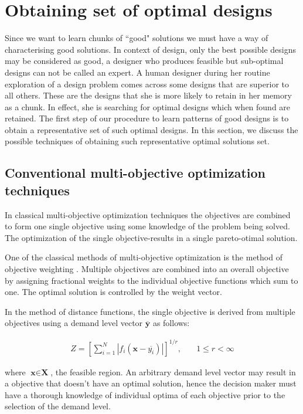 \section{Obtaining set of optimal designs}
Since we want to learn chunks of ``good" solutions we must have a way 
of characterising good solutions. In context of design, only the best
possible designs may be considered as good, a designer who produces 
feasible but sub-optimal designs can not be called an expert. A human 
designer during her routine exploration of a design problem comes 
across some designs that are superior to all others. These are the 
designs that she is more likely to retain in her memory as a chunk. In
effect, she is searching for optimal designs which when found are 
retained. The first step of our procedure to learn patterns of good 
designs is to obtain a representative set of such optimal designs.  
In this section, we discuss the possible techniques of obtaining such 
representative optimal solutions set.

\subsection{Conventional multi-objective optimization techniques}
In classical multi-objective optimization techniques the objectives 
are combined to form one single objective using some knowledge of the 
problem being solved. The optimization of the single objective-results
in a single pareto-otimal solution.

One of the classical methods of multi-objective optimization is the 
method of objective weighting \cite{deb2001,deb1994}. 
Multiple objectives are combined into an overall objective by 
assigning fractional weights to the individual objective functions 
which sum to one. The optimal solution is controlled by the weight 
vector. 

In the method of distance functions, the single objective is derived
from multiple objectives using a demand level vector 
$\overline{\textbf{y}}$ as follows:

\begin{align}
Z = \left[ \displaystyle\sum\limits_{i=1}^N {|f_i(\textbf{x} - \overline{y_i})|}\right] ^{1/r}, \quad &1 \leqslant r < \infty 
\end{align}

where $\textbf{x} \in \textbf{X}$, the feasible region. An arbitrary 
demand level vector may result in a objective that doesn't  have an 
optimal solution, hence the decision maker must have a thorough
knowledge of individual optima of each objective prior to the 
selection of the demand level.

